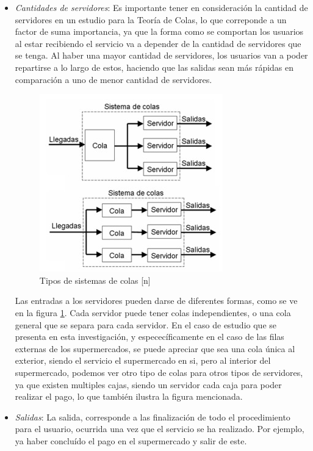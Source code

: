 \begin{itemize}
    \item \textit{Cantidades de servidores}:
    \newline
    Es importante tener en consideración la cantidad de servidores en un estudio para la Teoría de Colas, lo que correponde a un factor de suma importancia, ya que la forma como se comportan los usuarios al estar recibiendo el servicio va a depender de la cantidad de servidores que se tenga. Al haber una mayor cantidad de servidores, los usuarios van a poder repartirse a lo largo de estos, haciendo que las salidas sean más rápidas en comparación a uno de menor cantidad de servidores.\\

    \begin{figure}[H]
        \centering
        \includegraphics[width=.44\textwidth]{images/colasyservidores.jpeg}
        \caption{Tipos de sistemas de colas [n]} %
        \label{figtc2}
    \end{figure}
    
    Las entradas a los servidores pueden darse de diferentes formas, como se ve en la figura \ref{figtc2}. Cada servidor puede tener colas independientes, o una cola general que se separa para cada servidor. En el caso de estudio que se presenta en esta investigación, y espececíficamente en el caso de las filas externas de los supermercados, se puede apreciar que sea una cola única al exterior, siendo el servicio el supermercado en si, pero al interior del supermercado, podemos ver otro tipo de colas para otros tipos de servidores, ya que existen multiples cajas, siendo un servidor cada caja para poder realizar el pago, lo que también ilustra la figura mencionada.
    
    \item \textit{Salidas}:
    \newline
    La salida, corresponde a las finalización de todo el procedimiento para el usuario, ocurrida una vez que el servicio se ha realizado. Por ejemplo, ya haber concluído el pago en el supermercado y salir de este.
\end{itemize}

